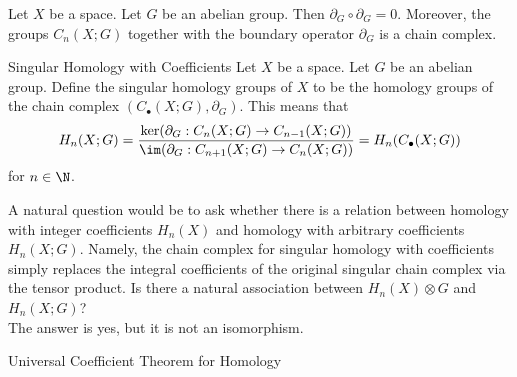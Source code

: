 \documentclass[a4paper]{article}
\begin{document}
\begin{lmm}{}{} Let $X$ be a space. Let $G$ be an abelian group. Then $\partial_G\circ\partial_G=0$. Moreover, the groups $C_n(X;G)$ together with the boundary operator $\partial_G$ is a chain complex. 
\end{lmm}

\begin{defn}{Singular Homology with Coefficients}{} Let $X$ be a space. Let $G$ be an abelian group. Define the singular homology groups of $X$ to be the homology groups of the chain complex $(C_\bullet(X;G),\partial_G)$. This means that $$H_n(X;G)=\frac{\ker(\partial_G:C_n(X;G)\to C_{n-1}(X;G))}{\im(\partial_G:C_{n+1}(X;G)\to C_n(X;G))}=H_n(C_\bullet(X;G))$$ for $n\in\N$. 
\end{defn}

A natural question would be to ask whether there is a relation between homology with integer coefficients $H_n(X)$ and homology with arbitrary coefficients $H_n(X;G)$. Namely, the chain complex for singular homology with coefficients simply replaces the integral coefficients of the original singular chain complex via the tensor product. Is there a natural association between $H_n(X)\otimes G$ and $H_n(X;G)$? \\

The answer is yes, but it is not an isomorphism. 

\begin{thm}{Universal Coefficient Theorem for Homology}{}\\
\end{thm}
\end{document}
